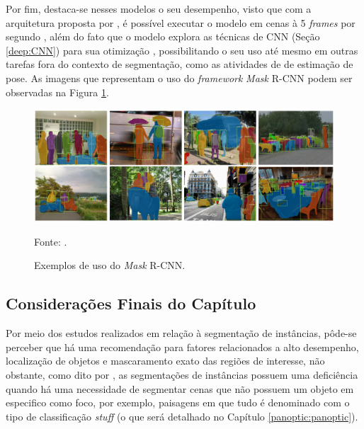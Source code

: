 Por fim, destaca-se nesses modelos o seu desempenho, visto que com a arquitetura proposta por \cite{He2020}, é possível executar o modelo em cenas à 5 \textit{frames} por segundo \cite{Minaee2021, He2020, Hafiz2020}, além do fato que o modelo explora as técnicas de CNN (Seção \ref{deep:CNN}) para sua otimização \cite{Li2020}, possibilitando o seu uso até mesmo em outras tarefas fora do contexto de segmentação, como as atividades de de estimação de pose. As imagens que representam o uso do \textit{framework} \textit{Mask} R-CNN podem ser observadas na Figura \ref{instance:fig:3}.

\begin{figure}[H]
    \centering
    \caption{Exemplos de uso do \textit{Mask} R-CNN.}
    \includegraphics[width=1\textwidth]{recursos/imagens/instance/insta_examp.png}
    \label{instance:fig:3}

    \vspace*{1 cm}
    Fonte: \cite{He2020}.
\end{figure}


\subsection{Considerações Finais do Capítulo}
\label{instance:conclusion}

Por meio dos estudos realizados em relação à segmentação de instâncias, pôde-se perceber que há uma recomendação para fatores relacionados a alto desempenho, localização de objetos e mascaramento exato das regiões de interesse, não obstante, como dito por \cite{Kirillov2019a}, as segmentações de instâncias possuem uma deficiência quando há uma necessidade de segmentar cenas que não possuem um objeto em especifico como foco, por exemplo, paisagens em que tudo é denominado com o tipo de classificação \textit{stuff} (o que será detalhado no Capítulo \ref{panoptic:panoptic}).